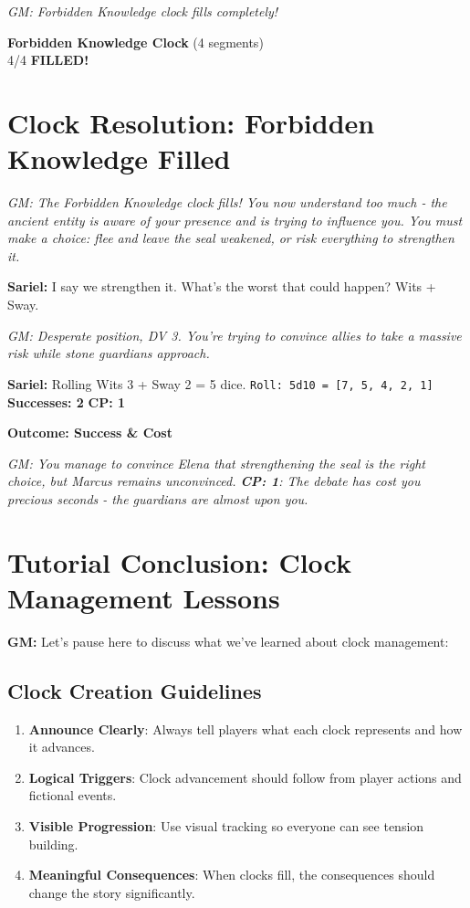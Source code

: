 \documentclass[11pt]{article}
\newcommand{\player}[1]{\textbf{#1:}}
\newcommand{\gm}[1]{\textit{GM: #1}}
\newcommand{\roll}[2]{\texttt{Roll: #1d10 = [#2]}}
\newcommand{\success}[1]{\textbf{Successes: #1}}
\newcommand{\cp}[1]{\textbf{CP: #1}}
\newcommand{\outcome}[1]{\textbf{Outcome: #1}}
\newcommand{\clocksegment}{\textbullet}
\begin{document}
\gm{Forbidden Knowledge clock fills completely!}

\begin{center}
\textbf{Forbidden Knowledge Clock} (4 segments)\\
\fbox{\textcolor{clockcolor}{\clocksegment\clocksegment\clocksegment\clocksegment}} 4/4 \textbf{FILLED!}
\end{center}

\section*{Clock Resolution: Forbidden Knowledge Filled}

\gm{The Forbidden Knowledge clock fills! You now understand too much - the ancient entity is aware of your presence and is trying to influence you. You must make a choice: flee and leave the seal weakened, or risk everything to strengthen it.}

\player{Sariel} I say we strengthen it. What's the worst that could happen? Wits + Sway.

\gm{Desperate position, DV 3. You're trying to convince allies to take a massive risk while stone guardians approach.}

\player{Sariel} Rolling Wits 3 + Sway 2 = 5 dice. \roll{5}{7, 5, 4, 2, 1} \success{2} \cp{1}

\outcome{Success \& Cost}

\gm{You manage to convince Elena that strengthening the seal is the right choice, but Marcus remains unconvinced. \cp{1}: The debate has cost you precious seconds - the guardians are almost upon you.}

\section*{Tutorial Conclusion: Clock Management Lessons}

\player{GM} Let's pause here to discuss what we've learned about clock management:

\subsection*{Clock Creation Guidelines}

\begin{enumerate}[leftmargin=*]
\item \textbf{Announce Clearly}: Always tell players what each clock represents and how it advances.
\item \textbf{Logical Triggers}: Clock advancement should follow from player actions and fictional events.
\item \textbf{Visible Progression}: Use visual tracking so everyone can see tension building.
\item \textbf{Meaningful Consequences}: When clocks fill, the consequences should change the story significantly.
\end{enumerate}
\end{document}
